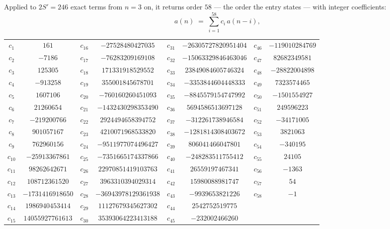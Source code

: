 \documentclass[11pt,a4paper]{article}
\theoremstyle{plain}
\theoremstyle{definition}
\begin{document}
Applied to $2S'=246$ exact terms from $n=3$ on, it returns order $58$ --- the
order the entry states --- with integer coefficients:
\[
a(n)\;=\;\sum_{i=1}^{58}c_i\,a(n-i),
\]
\begin{center}\small
\begin{tabular}{cccccccc}
$c_{1}$ & $161$ & $c_{16}$ & $-27528480427035$ & $c_{31}$ & $-26305727820951404$ & $c_{46}$ & $-119010284769$ \\
$c_{2}$ & $-7186$ & $c_{17}$ & $-76283209169108$ & $c_{32}$ & $-15063329846463046$ & $c_{47}$ & $82682349581$ \\
$c_{3}$ & $125305$ & $c_{18}$ & $171331918529552$ & $c_{33}$ & $23849084605746324$ & $c_{48}$ & $-28822004898$ \\
$c_{4}$ & $-913258$ & $c_{19}$ & $355001845678701$ & $c_{34}$ & $-3353844604448333$ & $c_{49}$ & $7323574465$ \\
$c_{5}$ & $1607106$ & $c_{20}$ & $-760160260451093$ & $c_{35}$ & $-8845579154747992$ & $c_{50}$ & $-1501554927$ \\
$c_{6}$ & $21260654$ & $c_{21}$ & $-1432430298353490$ & $c_{36}$ & $5694586513697128$ & $c_{51}$ & $249596223$ \\
$c_{7}$ & $-219200766$ & $c_{22}$ & $2924494658394752$ & $c_{37}$ & $-312261738946584$ & $c_{52}$ & $-34171005$ \\
$c_{8}$ & $901057167$ & $c_{23}$ & $4210071968533820$ & $c_{38}$ & $-1281814308403672$ & $c_{53}$ & $3821063$ \\
$c_{9}$ & $762960156$ & $c_{24}$ & $-9511977074496427$ & $c_{39}$ & $806041466047801$ & $c_{54}$ & $-340195$ \\
$c_{10}$ & $-25913367861$ & $c_{25}$ & $-7351665174337866$ & $c_{40}$ & $-248283511755412$ & $c_{55}$ & $24105$ \\
$c_{11}$ & $98262642671$ & $c_{26}$ & $22970851419103763$ & $c_{41}$ & $26559197467341$ & $c_{56}$ & $-1363$ \\
$c_{12}$ & $108712361520$ & $c_{27}$ & $3963310394029314$ & $c_{42}$ & $15980088981747$ & $c_{57}$ & $54$ \\
$c_{13}$ & $-1731416918650$ & $c_{28}$ & $-36943978129361938$ & $c_{43}$ & $-9939653821226$ & $c_{58}$ & $-1$ \\
$c_{14}$ & $1986940453414$ & $c_{29}$ & $11127679345627302$ & $c_{44}$ & $2542752519775$ &  &  \\
$c_{15}$ & $14055927761613$ & $c_{30}$ & $35393064223413188$ & $c_{45}$ & $-232002466260$ &  &  \\
\end{tabular}
\end{center}
\end{document}
